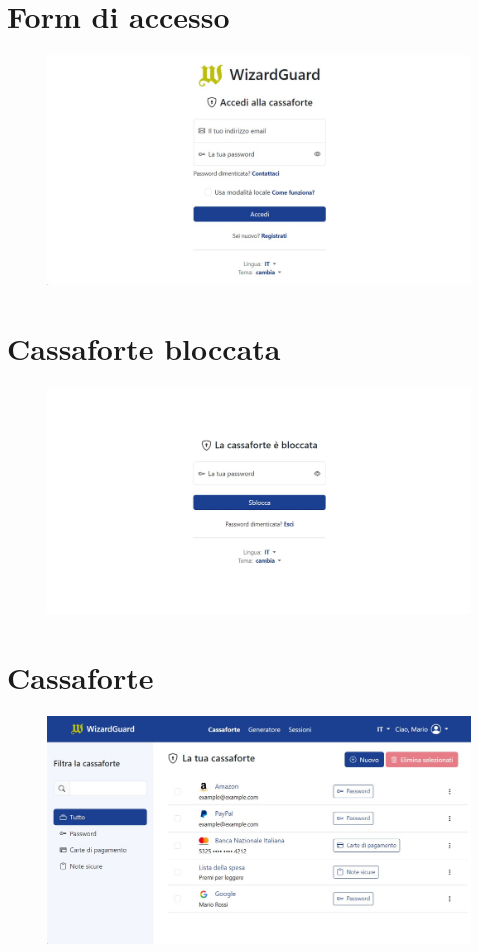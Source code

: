 \documentclass[a4paper]{report}
\begin{document}
\section{Form di accesso}
    \begin{figure}[H]
        \centering
        \includegraphics[width=1.0\textwidth]{figures/interfaces/signin}
    \end{figure}
    
\section{Cassaforte bloccata}
\begin{figure}[H]
        \centering
        \includegraphics[width=1.0\textwidth]{figures/interfaces/unlock}
    \end{figure}
\section{Cassaforte}
\begin{figure}[H]
        \centering
        \includegraphics[width=1.0\textwidth]{figures/interfaces/vault}
    \end{figure}
\end{document}
